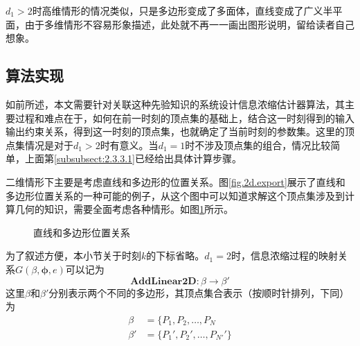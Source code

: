 $d_{1}>2$时高维情形的情况类似，只是多边形变成了多面体，直线变成了广义半平面，由于多维情形不容易形象描述，此处就不再一一画出图形说明，留给读者自己想象。

\subsection{算法实现}\label{subsect:2.3.4}
如前所述，本文需要针对关联这种先验知识的系统设计信息浓缩估计器算法，其主要过程和难点在于，如何在前一时刻的顶点集的基础上，结合这一时刻得到的输入输出约束关系，得到这一时刻的顶点集，也就确定了当前时刻的参数集。这里的顶点集情况是对于$d_{1}>2$时有意义。当$d_{1}=1$时不涉及顶点集的组合，情况比较简单，上面第\ref{subsubsect:2.3.3.1}已经给出具体计算步骤。

二维情形下主要是考虑直线和多边形的位置关系。图\ref{fig.2d.export}展示了直线和多边形位置关系的一种可能的例子，从这个图中可以知道求解这个顶点集涉及到计算几何的知识，需要全面考虑各种情形。如图\ref{fig.poly.l}所示。
\begin{figure}
	\centering
	\caption{直线和多边形位置关系}	 %
	\label{fig.poly.l}	 %
\end{figure}

为了叙述方便，本小节关于时刻$k$的下标省略。$d_{1}=2$时，信息浓缩过程的映射关系$G(\beta,\bm{\phi},e)$可以记为
\begin{equation}%
\mathbf{AddLinear2D}\colon \beta\rightarrow\beta'
\end{equation}
这里$\beta$和$\beta'$分别表示两个不同的多边形，其顶点集合表示（按顺时针排列，下同）为
\begin{equation*}%
\begin{split}%
\beta&=\{P_{1},P_{2},\ldots,P_{N}\\
\beta'&=\{P_{1}',P_{2}',\ldots,P_{N'}'\}
\end{split}
\end{equation*}

